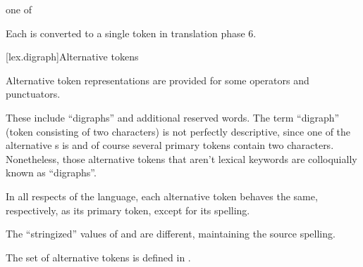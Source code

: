\begin{bnf}
 \textnormal{one of}\br
    \terminal{\{ \ \ \ \ \ \ \ \} \ \ \ \ \ \ \ [ \ \ \ \ \ \ \ ] \ \ \ \ \ \ \ ( \ \ \ \ \ \ \ ) \ \ \ \ \ \ \ [: \ \ \ \ \ \ :]}\br
    \br
    \br
    \terminal{! \ \ \ \ \ \ \ + \ \ \ \ \ \ \ - \ \ \ \ \ \ \ * \ \ \ \ \ \ \ / \ \ \ \ \ \ \ \% \ \ \ \ \ \ \ \caret{} \ \ \ \ \ \ \ \& \ \ \ \ \ \ \ |}\br
    \terminal{= \ \ \ \ \ \ \ += \ \ \ \ \ \ -= \ \ \ \ \ \ *= \ \ \ \ \ \ /= \ \ \ \ \ \ \%= \ \ \ \ \ \ \caret{}= \ \ \ \ \ \ \&= \ \ \ \ \ \ |=}\br
    \terminal{== \ \ \ \ \ \ != \ \ \ \ \ \ < \ \ \ \ \ \ \ > \ \ \ \ \ \ \ <= \ \ \ \ \ \ >= \ \ \ \ \ \ <=> \ \ \ \ \ \&\& \ \ \ \ \ \ ||}\br
    \terminal{<< \ \ \ \ \ \ >> \ \ \ \ \ \ <<= \ \ \ \ \ >>= \ \ \ \ \ ++ \ \ \ \ \ \ -- \ \ \ \ \ \ ,}\br
    \br
\end{bnf}

Each  is converted to a single token
in translation phase 6.%
%

[lex.digraph]{Alternative tokens}

\pnum
{}%
Alternative token representations are provided for some operators and
punctuators.
\begin{footnote}
%
These include ``digraphs'' and additional reserved words. The term
``digraph'' (token consisting of two characters) is not perfectly
descriptive, since one of the alternative s is
\tcode{\%:\%:} and of course several primary tokens contain two
characters. Nonetheless, those alternative tokens that aren't lexical
keywords are colloquially known as ``digraphs''.
\end{footnote}

\pnum
In all respects of the language, each alternative token behaves the
same, respectively, as its primary token, except for its spelling.
\begin{note}
The ``stringized'' values of
\tcode{[} and \tcode{<:} are different,
maintaining the source spelling.
\end{note}
The set of alternative tokens is defined in
.

